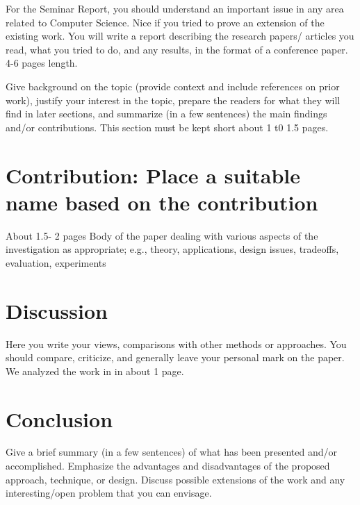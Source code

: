 \documentclass[11pt,a4paper,oldfontcommands]{memoir}
\begin{document}
For the Seminar Report, you should understand an important issue in any area related to Computer Science.  Nice if you tried to prove an extension of the existing work. You will write a report describing the research papers/  articles you read, what you tried to do, and any results, in the format of a conference paper. 4-6 pages length. 

Give background on the topic (provide context and include references on prior work), justify your interest
in the topic, prepare the readers for what they will find in later sections, and summarize (in a few
sentences) the main findings and/or contributions. This section must be kept short about 1 t0 1.5 pages. 

\section{Contribution:  Place a suitable name based on the contribution}
About 1.5- 2 pages Body of the paper dealing with various aspects of the investigation as appropriate; e.g., theory, applications, design issues,
tradeoffs, evaluation, experiments
\section {Discussion}
Here you write your views, comparisons with other methods or approaches. You should
compare, criticize, and generally leave your personal mark on the paper. 
We analyzed the work  in \cite{Oru:2013} in about 1 page.




\section{Conclusion}

Give a brief summary (in a few sentences) of what has been presented and/or accomplished. Emphasize
the advantages and disadvantages of the proposed approach, technique, or design. Discuss possible
extensions of the work and any interesting/open problem that you can envisage.



\end{document}
